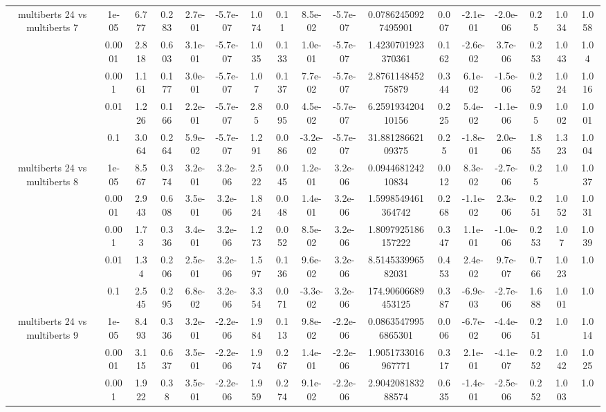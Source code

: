 \begin{tabular}{|c|c|c|c|c|c|c|c|c|c|c|c|c|c|c|c|c|}
\hline
\multirow{5}{*}{multiberts 24 vs multiberts 7} & 1e-05 & 6.777 & 0.283 & 2.7e-01 & -5.7e-07 & 1.074 & 0.11 & 8.5e-02 & -5.7e-07 & 0.07862450927495901 & 0.007 & -2.1e-01 & -2.0e-06 & 0.25 & 1.034 & 1.058 \\
 & 0.0001 & 2.818 & 0.603 & 3.1e-01 & -5.7e-07 & 1.035 & 0.133 & 1.0e-01 & -5.7e-07 & 1.4230701923370361 & 0.162 & -2.6e-02 & 3.7e-06 & 0.253 & 1.043 & 1.04 \\
 & 0.001 & 1.161 & 0.177 & 3.0e-01 & -5.7e-07 & 1.07 & 0.137 & 7.7e-02 & -5.7e-07 & 2.876114845275879 & 0.344 & 6.1e-02 & -1.5e-06 & 0.252 & 1.024 & 1.016 \\
 & 0.01 & 1.226 & 0.166 & 2.2e-01 & -5.7e-07 & 2.85 & 0.095 & 4.5e-02 & -5.7e-07 & 6.259193420410156 & 0.225 & 5.4e-02 & -1.1e-06 & 0.95 & 1.002 & 1.001 \\
 & 0.1 & 3.064 & 0.264 & 5.9e-02 & -5.7e-07 & 1.291 & 0.086 & -3.2e-02 & -5.7e-07 & 31.88128662109375 & 0.25 & -1.8e-01 & 2.0e-06 & 1.855 & 1.323 & 1.004 \\
\hline
\multirow{5}{*}{multiberts 24 vs multiberts 8} & 1e-05 & 8.567 & 0.374 & 3.2e-01 & 3.2e-06 & 2.522 & 0.045 & 1.2e-01 & 3.2e-06 & 0.094468124210834 & 0.012 & 8.3e-02 & -2.7e-06 & 0.25 & 1.0 & 1.037 \\
 & 0.0001 & 2.943 & 0.608 & 3.5e-01 & 3.2e-06 & 1.824 & 0.048 & 1.4e-01 & 3.2e-06 & 1.5998549461364742 & 0.268 & -1.1e-02 & 2.3e-06 & 0.251 & 1.052 & 1.031 \\
 & 0.001 & 1.73 & 0.336 & 3.4e-01 & 3.2e-06 & 1.273 & 0.052 & 8.5e-02 & 3.2e-06 & 1.8097925186157222 & 0.347 & 1.1e-01 & -1.0e-06 & 0.253 & 1.07 & 1.039 \\
 & 0.01 & 1.34 & 0.206 & 2.5e-01 & 3.2e-06 & 1.597 & 0.136 & 9.6e-02 & 3.2e-06 & 8.514533996582031 & 0.453 & 2.4e-02 & 9.7e-07 & 0.766 & 1.023 & 1.0 \\
 & 0.1 & 2.545 & 0.295 & 6.8e-02 & 3.2e-06 & 3.354 & 0.071 & -3.3e-02 & 3.2e-06 & 174.90606689453125 & 0.387 & -6.9e-03 & -2.7e-06 & 1.688 & 1.001 & 1.0 \\
\hline
\multirow{5}{*}{multiberts 24 vs multiberts 9} & 1e-05 & 8.493 & 0.336 & 3.2e-01 & -2.2e-06 & 1.984 & 0.113 & 9.8e-02 & -2.2e-06 & 0.08635479956865301 & 0.006 & -6.7e-02 & -4.4e-06 & 0.251 & 1.0 & 1.014 \\
 & 0.0001 & 3.115 & 0.637 & 3.5e-01 & -2.2e-06 & 1.974 & 0.267 & 1.4e-01 & -2.2e-06 & 1.9051733016967771 & 0.317 & 2.1e-01 & -4.1e-07 & 0.252 & 1.042 & 1.025 \\
 & 0.001 & 1.922 & 0.38 & 3.5e-01 & -2.2e-06 & 1.959 & 0.274 & 9.1e-02 & -2.2e-06 & 2.904208183288574 & 0.635 & -1.4e-01 & -2.5e-06 & 0.252 & 1.003 & 1.0 \\

\end{tabular}
